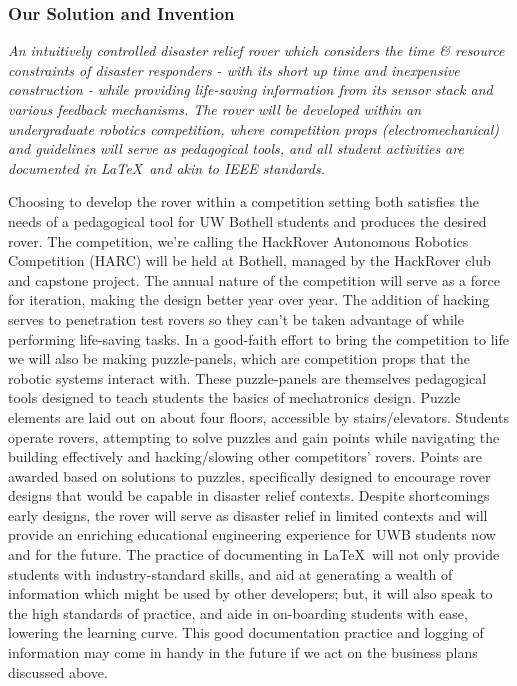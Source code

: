 \documentclass[a4paper, 10pt]{article}
\begin{document}
		\subsubsection*{Our Solution and Invention}
		\textit{An intuitively controlled disaster relief rover which considers the time \& resource constraints of disaster responders - with its short up time and inexpensive construction - while providing life-saving information from its sensor stack and various feedback mechanisms. The rover will be developed within an undergraduate robotics competition, where competition props (electromechanical) and guidelines will serve as pedagogical tools, and all student activities are documented in \LaTeX\ and akin to IEEE standards.}		
		
		Choosing to develop the rover within a competition setting both satisfies the needs of a pedagogical tool for UW Bothell students and produces the desired rover. The competition, we're calling the HackRover Autonomous Robotics Competition (HARC) will be held at Bothell, managed by the HackRover club and capstone project. The annual nature of the competition will serve as a force for iteration, making the design better year over year. The addition of hacking serves to penetration test rovers so they can't be taken advantage of while performing life-saving tasks. In a good-faith effort to bring the competition to life we will also be making puzzle-panels, which are competition props that the robotic systems interact with. These puzzle-panels are themselves pedagogical tools designed to teach students the basics of mechatronics design. Puzzle elements are laid out on about four floors, accessible by stairs/elevators. Students operate rovers, attempting to solve puzzles and gain points while navigating the building effectively and hacking/slowing other competitors' rovers. Points are awarded based on solutions to puzzles, specifically designed to encourage rover designs that would be capable in disaster relief contexts.
		Despite shortcomings early designs, the rover will serve as disaster relief in limited contexts and will provide an enriching educational engineering experience for UWB students now and for the future. The practice of documenting in \LaTeX\ will not only provide students with industry-standard skills, and aid at generating a wealth of information which might be used by other developers; but, it will also speak to the high standards of practice, and aide in on-boarding students with ease, lowering the learning curve. This good documentation practice and logging of information may come in handy in the future if we act on the business plans discussed above.
	
\end{document}
